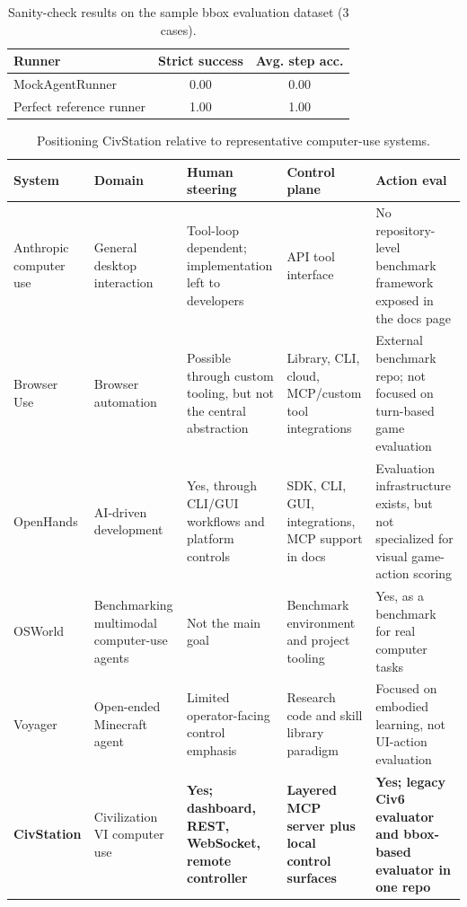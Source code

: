 \begin{table}[t]
\centering
\caption{Sanity-check results on the sample bbox evaluation dataset (3 cases).}
\label{tab:sanity-eval}
\begin{tabular}{lcc}
\toprule
\textbf{Runner} & \textbf{Strict success} & \textbf{Avg. step acc.} \\
\midrule
MockAgentRunner & 0.00 & 0.00 \\
Perfect reference runner & 1.00 & 1.00 \\
\bottomrule
\end{tabular}
\end{table}

\begin{table}[t]
\centering
\caption{Positioning CivStation relative to representative computer-use systems.}
\label{tab:related-systems}
\scriptsize
\begin{tabular}{p{1.55cm} p{1.55cm} p{1.8cm} p{2.0cm} p{3.7cm}}
\toprule
\textbf{System} & \textbf{Domain} & \textbf{Human steering} & \textbf{Control plane} & \textbf{Action eval} \\
\midrule
Anthropic computer use \cite{anthropic_computer_use} & General desktop interaction & Tool-loop dependent; implementation left to developers & API tool interface & No repository-level benchmark framework exposed in the docs page \\
Browser Use \cite{browser_use} & Browser automation & Possible through custom tooling, but not the central abstraction & Library, CLI, cloud, MCP/custom tool integrations & External benchmark repo; not focused on turn-based game evaluation \\
OpenHands \cite{openhands_docs, openhands_repo} & AI-driven development & Yes, through CLI/GUI workflows and platform controls & SDK, CLI, GUI, integrations, MCP support in docs & Evaluation infrastructure exists, but not specialized for visual game-action scoring \\
OSWorld \cite{osworld_project} & Benchmarking multimodal computer-use agents & Not the main goal & Benchmark environment and project tooling & Yes, as a benchmark for real computer tasks \\
Voyager \cite{voyager} & Open-ended Minecraft agent & Limited operator-facing control emphasis & Research code and skill library paradigm & Focused on embodied learning, not UI-action evaluation \\
\textbf{CivStation} \cite{civstation_repo} & Civilization VI computer use & \textbf{Yes; dashboard, REST, WebSocket, remote controller} & \textbf{Layered MCP server plus local control surfaces} & \textbf{Yes; legacy Civ6 evaluator and bbox-based evaluator in one repo} \\
\bottomrule
\end{tabular}
\end{table}

